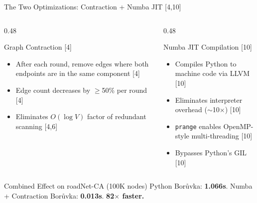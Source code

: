 \documentclass[aspectratio=169, 11pt]{beamer}
\begin{document}
\begin{frame}{The Two Optimizations: Contraction + Numba JIT [4,10]}
\begin{columns}[T]
\begin{column}{0.48\textwidth}
\begin{block}{Graph Contraction [4]}
\begin{itemize}
    \item After each round, remove edges where both endpoints are in the same component [4]
    \item Edge count decreases by $\geq$50\% per round [4]
    \item Eliminates $O(\log V)$ factor of redundant scanning [4,6]
\end{itemize}
\end{block}
\end{column}
\begin{column}{0.48\textwidth}
\begin{block}{Numba JIT Compilation [10]}
\begin{itemize}
    \item Compiles Python to machine code via LLVM [10]
    \item Eliminates interpreter overhead ($\sim$10$\times$) [10]
    \item \texttt{prange} enables OpenMP-style multi-threading [10]
    \item Bypasses Python's GIL [10]
\end{itemize}
\end{block}
\end{column}
\end{columns}
\vspace{0.3em}
\begin{block}{Combined Effect on roadNet-CA (100K nodes)}
Python Bor\r{u}vka: \textbf{1.066s}. \quad Numba + Contraction Bor\r{u}vka: \textbf{0.013s}. \quad \textbf{82$\times$ faster.}
\end{block}
\end{frame}
\end{document}
